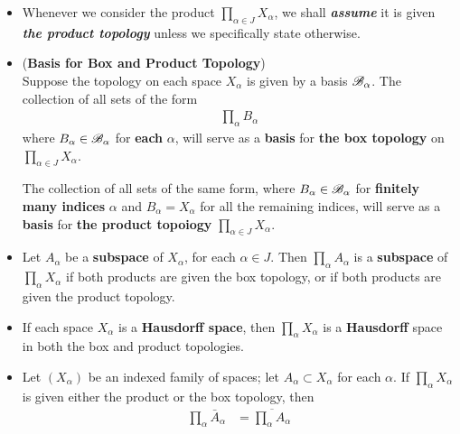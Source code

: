 \documentclass[11pt]{article}
\begin{document}
\begin{itemize}
\item \begin{remark}
Whenever we consider the product $\prod_{\alpha \in J} X_{\alpha}$, we shall \emph{\textbf{assume}} it is given \emph{\textbf{the product topology}} unless we specifically state otherwise.
\end{remark}

\item \begin{proposition} (\textbf{Basis for Box and Product Topology})\\
Suppose the topology on each space $X_{\alpha}$ is given by a basis  ${\mathscr B}_{\alpha}$. The collection of all sets of the form
\begin{align*}
\prod_{\alpha}B_{\alpha}
\end{align*}
where $B_{\alpha} \in {\mathscr B}_{\alpha}$ for \textbf{each} $\alpha$, will serve as a \textbf{basis} for \textbf{the box topology} on $\prod_{\alpha \in J} X_{\alpha}$.

The collection of all sets of the same form, where $B_{\alpha} \in {\mathscr B}_{\alpha}$ for \textbf{finitely many indices} $\alpha$ and $B_{\alpha} = X_{\alpha}$ for all the remaining indices, will serve as a \textbf{basis} for \textbf{the product topoiogy} $\prod_{\alpha \in J} X_{\alpha}$.
\end{proposition}

\item \begin{proposition}
Let $A_{\alpha}$ be a \textbf{subspace} of $X_{\alpha}$, for each $\alpha \in J$. Then $\prod_{\alpha}A_{\alpha}$ is a \textbf{subspace} of $\prod_{\alpha}X_{\alpha}$ if both products are given the box topology, or if both products are given the product topology.
\end{proposition}


\item \begin{proposition}
If each space $X_{\alpha}$ is a \textbf{Hausdorff space}, then $\prod_{\alpha}X_{\alpha}$ is a \textbf{Hausdorff} space in both the box and product topologies.
\end{proposition}

\item \begin{proposition}
Let $(X_{\alpha})$ be an indexed family of spaces; let $A_{\alpha} \subset X_{\alpha}$ for each $\alpha$. If $\prod_{\alpha}X_{\alpha}$ is given either the product or the box topology, then
\begin{align*}
\prod_{\alpha}\bar{A}_{\alpha} &= \overline{\prod_{\alpha}A_{\alpha}}
\end{align*}
\end{proposition}


\end{itemize}
\end{document}
